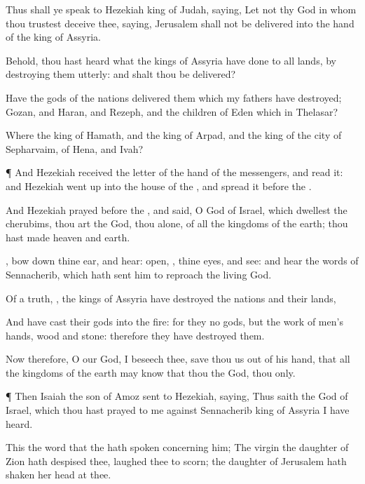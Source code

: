 {Thus shall ye
speak to
Hezekiah
king of
Judah,
saying, Let not thy
God in whom thou
trustest
deceive thee,
saying,
Jerusalem shall not be
delivered into the
hand of the
king of
Assyria.

Behold, thou hast
heard what the
kings of
Assyria have
done to all
lands, by destroying them
utterly: and shalt thou be
delivered?

Have the
gods of the
nations
delivered them which my
fathers have
destroyed;
{}
Gozan, and
Haran, and
Rezeph, and the
children of
Eden which
{} in
Thelasar?

Where
{} the
king of
Hamath, and the
king of
Arpad, and the
king of the
city of
Sepharvaim, of
Hena, and
Ivah?


\par }{\PP {}¶ And
Hezekiah
received the
letter of the
hand of the
messengers, and
read it: and
Hezekiah went
up into the
house of the
{}, and
spread it
before the
{}.

And
Hezekiah
prayed
before the
{}, and
said, O
{}
God of
Israel, which
dwellest
{} the
cherubims, thou art the
God,
{} thou alone, of all the
kingdoms of the
earth; thou hast
made
heaven and
earth.

, bow
down thine
ear, and
hear:
open,
{}, thine
eyes, and
see: and
hear the
words of
Sennacherib, which hath
sent him to
reproach the
living
God.

Of a
truth,
{}, the
kings of
Assyria have
destroyed the
nations and their
lands,

And have
cast their
gods into the
fire: for they
{} no
gods, but the
work of
men’s
hands,
wood and
stone: therefore they have
destroyed them.

Now therefore, O
{} our
God, I beseech thee,
save thou us out of his
hand, that all the
kingdoms of the
earth may
know that thou
{} the
{}
God,
{} thou only.


\par }{\PP {}¶ Then
Isaiah the
son of
Amoz
sent to
Hezekiah,
saying, Thus
saith the
{}
God of
Israel,
{} which thou hast
prayed to me against
Sennacherib
king of
Assyria I have
heard.

This
{} the
word that the
{} hath
spoken concerning him; The
virgin the
daughter of
Zion hath
despised thee,
{} laughed thee to
scorn; the
daughter of
Jerusalem hath
shaken her
head at
thee.

}
